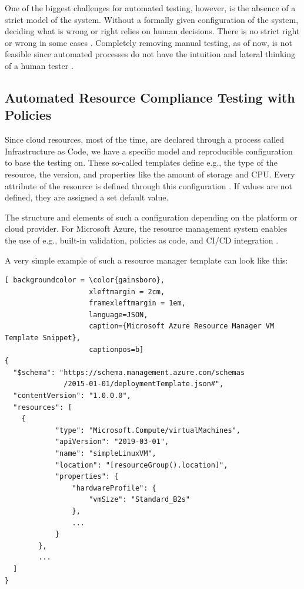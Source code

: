 One of the biggest challenges for automated testing, however, is the absence of a strict model of the system. Without a formally given configuration of the system, deciding what is wrong or right relies on human decisions. There is no strict right or wrong in some cases \citep{mbst2012}.
Completely removing manual testing, as of now, is not feasible since automated processes do not have the intuition and lateral thinking of a human tester \citep{portswigger2020}.


\subsection{Automated Resource Compliance Testing with Policies}
\label{infrastructure_testing}
Since cloud resources, most of the time, are declared through a process called Infrastructure as Code, we have a specific model and reproducible configuration to base the testing on. 
These so-called templates define e.g., the type of the resource, the version, and properties like the amount of storage and CPU. Every attribute of the resource is defined through this configuration \citep{awsIac2017}. If values are not defined, they are assigned a set default value.

The structure and elements of such a configuration depending on the platform or cloud provider. For Microsoft Azure, the resource management system enables the use of e.g., built-in validation, policies as code, and CI/CD integration \citep{azureResourceTemp2020}.

A very simple example of such a resource manager template can look like this:

\begin{lstlisting}[ backgroundcolor = \color{gainsboro}, 
                    xleftmargin = 2cm, 
                    framexleftmargin = 1em, 
                    language=JSON,
                    caption={Microsoft Azure Resource Manager VM Template Snippet},
                    captionpos=b]
{
  "$schema": "https://schema.management.azure.com/schemas
              /2015-01-01/deploymentTemplate.json#",
  "contentVersion": "1.0.0.0",
  "resources": [
    {
            "type": "Microsoft.Compute/virtualMachines",
            "apiVersion": "2019-03-01",
            "name": "simpleLinuxVM",
            "location": "[resourceGroup().location]",
            "properties": {
                "hardwareProfile": {
                    "vmSize": "Standard_B2s"
                },
                ...
            }
        },
        ...
  ]
}
\end{lstlisting}

